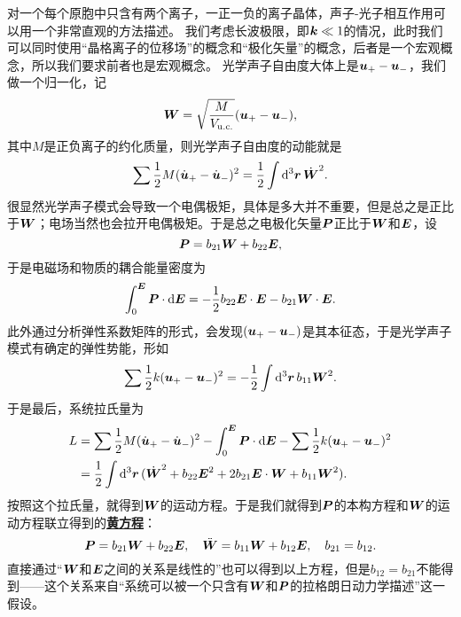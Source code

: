 \documentclass[hyperref, UTF8, a4paper]{ctexart}
\newcommand*{\concept}[1]{\underline{\textbf{#1}}}
\begin{document}
对一个每个原胞中只含有两个离子，一正一负的离子晶体，声子-光子相互作用可以用一个非常直观的方法描述。
我们考虑长波极限，即$\vb*{k} \ll 1$的情况，此时我们可以同时使用“晶格离子的位移场”的概念和“极化矢量”的概念，后者是一个宏观概念，所以我们要求前者也是宏观概念。
光学声子自由度大体上是$\vb*{u}_+ - \vb*{u}_-$，我们做一个归一化，记
\begin{equation}
    \vb*{W} = \sqrt{\frac{M}{V_\text{u.c.}}} (\vb*{u}_+ - \vb*{u}_-),
\end{equation}
其中$M$是正负离子的约化质量，则光学声子自由度的动能就是
\[
    \sum \frac{1}{2} M (\dot{\vb*{u}}_+ - \dot{\vb*{u}}_-)^2 = \frac{1}{2} \int \dd[3]{\vb*{r}} \dot{\vb*{W}}^2.
\]
很显然光学声子模式会导致一个电偶极矩，具体是多大并不重要，但是总之是正比于$\vb*{W}$；电场当然也会拉开电偶极矩。于是总之电极化矢量$\vb*{P}$正比于$\vb*{W}$和$\vb*{E}$，设
\begin{equation}
    \vb*{P} = b_{21} \vb*{W} + b_{22} \vb*{E},
\end{equation}
于是电磁场和物质的耦合能量密度为
\[
    \int_0^{\vb*{E}} \vb*{P} \cdot \dd{\vb*{E}} = - \frac{1}{2} b_{22} \vb*{E} \cdot \vb*{E} - b_{21} \vb*{W} \cdot \vb*{E}. 
\]
此外通过分析弹性系数矩阵的形式，会发现$(\vb*{u}_+ - \vb*{u}_-)$是其本征态，于是光学声子模式有确定的弹性势能，形如
\[
    \sum \frac{1}{2} k (\vb*{u}_+ - \vb*{u}_-)^2 = - \frac{1}{2} \int \dd[3]{\vb*{r}} b_{11} \vb*{W}^2.
\]
于是最后，系统拉氏量为
\begin{equation}
    \begin{aligned}
        L &= \sum \frac{1}{2} M (\dot{\vb*{u}}_+ - \dot{\vb*{u}}_-)^2 - \int_0^{\vb*{E}} \vb*{P} \cdot \dd{\vb*{E}} - \sum \frac{1}{2} k (\vb*{u}_+ - \vb*{u}_-)^2 \\
        &= \frac{1}{2} \int \dd[3]{\vb*{r}} (\dot{\vb*{W}}^2 + b_{22} \vb*{E}^2 + 2 b_{21} \vb*{E} \cdot \vb*{W} + b_{11} \vb*{W}^2).
    \end{aligned}
\end{equation}
按照这个拉氏量，就得到$\vb*{W}$的运动方程。于是我们就得到$\vb*{P}$的本构方程和$\vb*{W}$的运动方程联立得到的\concept{黄方程}：
\begin{equation}
    \vb*{P} = b_{21} \vb*{W} + b_{22} \vb*{E}, \quad \ddot{\vb*{W}} = b_{11} \vb*{W} + b_{12} \vb*{E}, \quad b_{21} = b_{12}.
    \label{eq:huang-eq}
\end{equation}
直接通过“$\vb*{W}$和$\vb*{E}$之间的关系是线性的”也可以得到以上方程，但是$b_{12} = b_{21}$不能得到——这个关系来自“系统可以被一个只含有$\vb*{W}$和$\vb*{P}$的拉格朗日动力学描述”这一假设。
\end{document}

